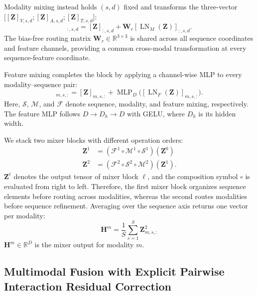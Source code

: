 \documentclass[letterpaper]{article} %
\begin{document}
Modality mixing instead holds $(s,d)$ fixed and transforms the
three-vector $\bigl[[\mathbf{Z}]_{V,s,d};
[\mathbf{Z}]_{A,s,d};[\mathbf{Z}]_{T,s,d}\bigr]$:
\begin{equation}
[\mathcal{M}(\mathbf{Z})]_{:,s,d}
=[\mathbf{Z}]_{:,s,d}
+\mathbf{W}_{r}
  [\operatorname{LN}_{M}(\mathbf{Z})]_{:,s,d}.
\label{eq:modality_mixing}
\end{equation}
The bias-free routing matrix
$\mathbf{W}_{r}\in\mathbb{R}^{3\times3}$ is shared across all sequence
coordinates and feature channels, providing a common cross-modal
transformation at every sequence-feature coordinate.

Feature mixing completes the block by applying a channel-wise MLP to every
modality--sequence pair:
\begin{equation}
[\mathcal{F}(\mathbf{Z})]_{m,s,:}
=[\mathbf{Z}]_{m,s,:}
+\operatorname{MLP}_{D}
  \bigl([\operatorname{LN}_{F}(\mathbf{Z})]_{m,s,:}\bigr).
\label{eq:feature_mixing}
\end{equation}
Here, $\mathcal{S}$, $\mathcal{M}$, and $\mathcal{F}$ denote sequence,
modality, and feature mixing, respectively.  The feature MLP follows
$D\!\rightarrow\!D_h\!\rightarrow\!D$ with GELU, where $D_h$ is its
hidden width.

We stack two mixer blocks with different operation orders:
\begin{equation}
\begin{aligned}
\mathbf{Z}^{1}
&=(\mathcal{F}^{1}\circ\mathcal{M}^{1}\circ\mathcal{S}^{1})
  (\mathbf{Z}^{0}) \\
\mathbf{Z}^{2}
&=(\mathcal{F}^{2}\circ\mathcal{S}^{2}\circ\mathcal{M}^{2})
  (\mathbf{Z}^{1}).
\end{aligned}
\label{eq:alternating_blocks}
\end{equation}
$\mathbf{Z}^{\ell}$ denotes the output tensor of mixer block $\ell$,
and the composition symbol $\circ$ is evaluated from right to left.
Therefore, the first mixer block organizes sequence elements before routing
across modalities, whereas the second routes modalities before sequence
refinement. Averaging over the sequence axis returns one vector per
modality:
\begin{equation}
\mathbf{H}^{m}=\frac{1}{S}\sum_{s=1}^{S}\mathbf{Z}^{2}_{m,s,:}
\label{eq:mixer_output}
\end{equation}
$\mathbf{H}^{m}\in\mathbb{R}^{D}$ is the mixer output for modality $m$.


\subsection{Multimodal Fusion with Explicit Pairwise Interaction Residual Correction}
\end{document}
